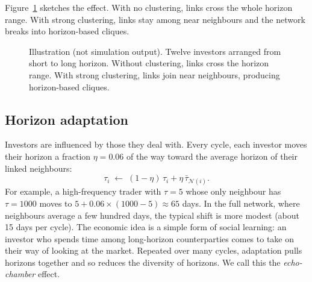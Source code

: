 Figure~\ref{fig:tikz} sketches the effect. With no clustering, links cross the whole horizon range. With strong clustering, links stay among near neighbours and the network breaks into horizon-based cliques.

\begin{figure}[htbp]
\centering
{}
\caption{Illustration (not simulation output). Twelve investors arranged from short to long horizon. Without clustering, links cross the horizon range. With strong clustering, links join near neighbours, producing horizon-based cliques.}
\label{fig:tikz}
\end{figure}

\subsection{Horizon adaptation}

Investors are influenced by those they deal with. Every cycle, each investor moves their horizon a fraction $\eta=0.06$ of the way toward the average horizon of their linked neighbours:
\begin{equation}
\tau_i \;\leftarrow\; (1-\eta)\,\tau_i + \eta\,\bar\tau_{\mathcal N(i)} .
\label{eq:adapt}
\end{equation}
For example, a high-frequency trader with $\tau=5$ whose only neighbour has $\tau=1000$ moves to $5+0.06\times(1000-5)\approx 65$ days. In the full network, where neighbours average a few hundred days, the typical shift is more modest (about 15 days per cycle). The economic idea is a simple form of social learning: an investor who spends time among long-horizon counterparties comes to take on their way of looking at the market. Repeated over many cycles, adaptation pulls horizons together and so reduces the diversity of horizons. We call this the \emph{echo-chamber} effect.

